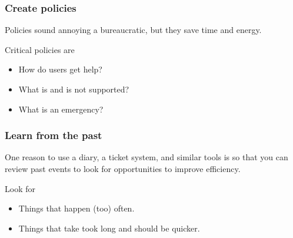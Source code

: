 \documentclass[10pt]{beamer}
\begin{document}
\begin{frame}
  \frametitle{Create policies}
  
    Policies sound annoying a bureaucratic, but they save time and energy.
    
    Critical policies are 
    
    \begin{itemize}
      \item How do users get help?
      \item What is and is not supported?
      \item What is an emergency?
    \end{itemize}
     
\end{frame}


\begin{frame}
  \frametitle{Learn from the past}
  
    One reason to use a diary, a ticket system, and similar tools
    is so that you can review past events to look for opportunities to 
    improve efficiency.
    
    Look for 
    
    \begin{itemize}
      \item Things that happen (too) often.
      \item Things that take took long and should be quicker.
    \end{itemize}
     
\end{frame}
\end{document}
